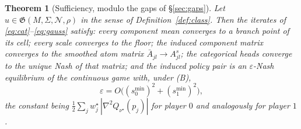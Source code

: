 \documentclass[11pt]{article}
\newtheorem{theorem}{Theorem}
\theoremstyle{definition}
\newcommand{\cN}{\mathcal{N}}
\begin{document}
\begin{theorem}[Sufficiency, modulo the gaps of §\ref{sec:gaps}]\label{thm:main}
Let $u \in \mathfrak{G}(M,\Sigma,\cN,\rho)$ in the sense of
Definition~\ref{def:class}. Then the iterates of
\eqref{eq:cat}--\eqref{eq:gauss} satisfy: every component mean converges to a
branch point of its cell; every scale converges to the floor; the induced
component matrix converges to the smoothed atom matrix
$\bar A_{jl} \to A^{s}_{jl}$; the categorical heads converge to the unique Nash
of that matrix; and the induced policy pair is an $\varepsilon$-Nash equilibrium
of the continuous game with, \emph{under} (B),
\begin{equation}\label{eq:bias}
  \varepsilon = O\big((s^{\min}_0)^2 + (s^{\min}_1)^2\big),
\end{equation}
the constant being $\tfrac12 \sum_j w^\star_j\, |\nabla^2 Q_{\nu^\star}(p_j)|$
for player $0$ and analogously for player $1$.
\end{theorem}
\end{document}

